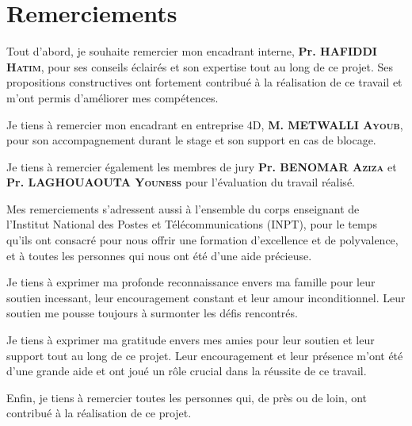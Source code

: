 \chapter*{Remerciements}

\begin{spacing}{1.25}


Tout d’abord, je souhaite remercier mon encadrant interne, \textbf{Pr. HAFIDDI \textsc{Hatim}}, pour ses conseils éclairés et son expertise tout au long de ce projet. Ses propositions constructives ont fortement contribué à la réalisation de ce travail et m’ont permis d’améliorer mes compétences.
\newline

Je tiens à remercier mon encadrant en entreprise 4D, \textbf{M. METWALLI \textsc{Ayoub}}, pour son accompagnement durant le stage et son support en cas de blocage. 
\newline

Je tiens à remercier également les membres de jury \textbf{Pr. BENOMAR \textsc{Aziza}} et \textbf{Pr. LAGHOUAOUTA \textsc{Youness}} pour l'évaluation du travail réalisé. 
\newline

Mes remerciements s'adressent aussi à l'ensemble du corps enseignant de l'Institut National des Postes et Télécommunications (INPT), pour le temps qu'ils ont consacré pour nous offrir une formation d'excellence et de polyvalence, et à toutes les personnes qui nous ont été d'une aide précieuse. 
\newline

Je tiens à exprimer ma profonde reconnaissance envers ma famille pour leur soutien incessant, leur encouragement constant et leur amour inconditionnel. Leur soutien me pousse toujours à surmonter les défis rencontrés.
\newline

Je tiens à exprimer ma gratitude envers mes amies pour leur soutien et leur support tout au long de ce projet. Leur encouragement et leur présence m'ont été d'une grande aide et ont joué un rôle crucial dans la réussite de ce travail.
\newline

Enfin, je tiens à remercier toutes les personnes qui, de près ou de loin, ont contribué à la réalisation de ce projet. 
\newline

\end{spacing}
